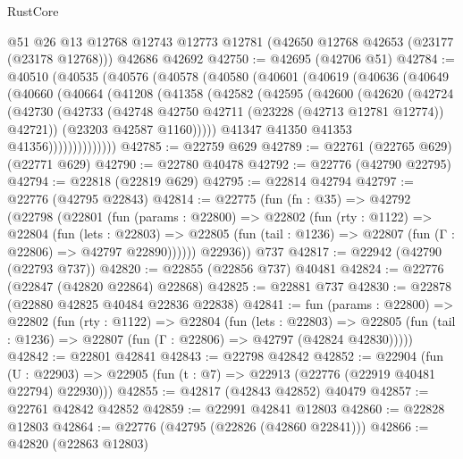 \begin{lexlean}{RustCore}
\begin{coremodule}
    @51
    @26
    @13
    @12768
    @12743
    @12773
    @12781
    (@42650 @12768 @42653 (@23177 (@23178 @12768)))
    @42686
    @42692
@42750 := @42695 (@42706 @51)
@42784 := @40510
    (@40535
      (@40576
        (@40578
          (@40580
            (@40601
              (@40619
                (@40636
                  (@40649
                    (@40660
                      (@40664
                        (@41208
                          (@41358
                            (@42582
                              (@42595
                                (@42600
                                  (@42620
                                    (@42724
                                      (@42730
                                        (@42733
                                          (@42748
                                            @42750
                                            @42711
                                            (@23228 (@42713 @12781 @12774))
                                            @42721))
                                        (@23203 @42587 @1160)))))
                                @41347
                                @41350
                                @41353
                                @41356))))))))))))))
@42785 := @22759 @629
@42789 := @22761 (@22765 @629) (@22771 @629)
@42790 := @22780 @40478
@42792 := @22776 (@42790 @22795)
@42794 := @22818 (@22819 @629)
@42795 := @22814 @42794
@42797 := @22776 (@42795 @22843)
@42814 := @22775
    (fun (fn : @35) =>
    @42792
      (@22798
        (@22801
          (fun (params : @22800) =>
          @22802
            (fun (rty : @1122) =>
            @22804
              (fun (lets : @22803) =>
              @22805 (fun (tail : @1236) => @22807 (fun (Γ : @22806) => @42797 @22890))))))
        @22936))
    @737
@42817 := @22942 (@42790 (@22793 @737))
@42820 := @22855 (@22856 @737) @40481
@42824 := @22776 (@22847 (@42820 @22864) @22868)
@42825 := @22881 @737
@42830 := @22878 (@22880 @42825 @40484 @22836 @22838)
@42841 := fun (params : @22800) =>
  @22802
    (fun (rty : @1122) =>
    @22804
      (fun (lets : @22803) =>
      @22805 (fun (tail : @1236) => @22807 (fun (Γ : @22806) => @42797 (@42824 @42830)))))
@42842 := @22801 @42841
@42843 := @22798 @42842
@42852 := @22904
    (fun (U : @22903) => @22905 (fun (t : @7) => @22913 (@22776 (@22919 @40481 @22794) @22930)))
@42855 := @42817 (@42843 @42852) @40479
@42857 := @22761 @42842 @42852
@42859 := @22991 @42841 @12803
@42860 := @22828 @12803
@42864 := @22776 (@42795 (@22826 (@42860 @22841)))
@42866 := @42820 (@22863 @12803)

\end{coremodule}
\end{lexlean}
